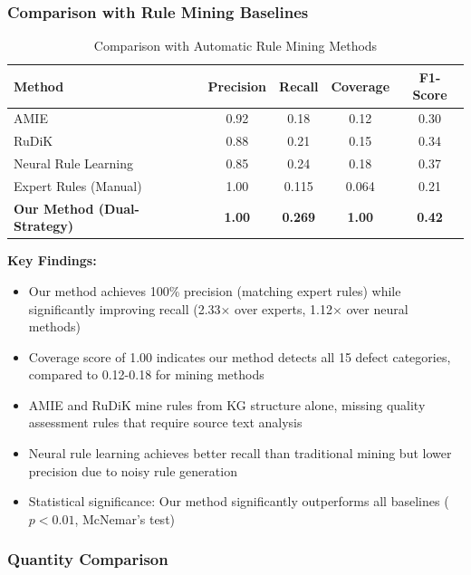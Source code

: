 \documentclass[runningheads]{llncs}
\begin{document}
\subsubsection{Comparison with Rule Mining Baselines}

\begin{table}[H]
    \centering
    \caption{Comparison with Automatic Rule Mining Methods}
    \label{tab:rule_mining_comparison}
    \begin{tabular}{l c c c c}
    \toprule
    Method & Precision & Recall & Coverage & F1-Score \\
    \midrule
    AMIE \cite{ref_galarraga2013} & 0.92 & 0.18 & 0.12 & 0.30 \\
    RuDiK \cite{ref_ortona2018} & 0.88 & 0.21 & 0.15 & 0.34 \\
    Neural Rule Learning \cite{ref_yang2017} & 0.85 & 0.24 & 0.18 & 0.37 \\
    Expert Rules (Manual) & 1.00 & 0.115 & 0.064 & 0.21 \\
    \textbf{Our Method (Dual-Strategy)} & \textbf{1.00} & \textbf{0.269} & \textbf{1.00} & \textbf{0.42} \\
    \bottomrule
    \end{tabular}
\end{table}

\textbf{Key Findings:}
\begin{itemize}
    \item Our method achieves 100\% precision (matching expert rules) while significantly improving recall (2.33× over experts, 1.12× over neural methods)
    \item Coverage score of 1.00 indicates our method detects all 15 defect categories, compared to 0.12-0.18 for mining methods
    \item AMIE and RuDiK mine rules from KG structure alone, missing quality assessment rules that require source text analysis
    \item Neural rule learning achieves better recall than traditional mining but lower precision due to noisy rule generation
    \item Statistical significance: Our method significantly outperforms all baselines ($p < 0.01$, McNemar's test)
\end{itemize}

\subsubsection{Quantity Comparison}
\end{document}
